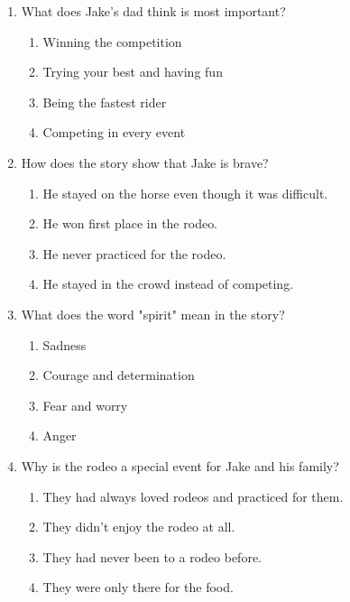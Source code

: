 \documentclass[12pt]{article}
\begin{document}
\begin{enumerate}
    \vspace{0.5cm}

    \item What does Jake's dad think is most important?

    \begin{enumerate}[label=\Alph*.]
        \item Winning the competition
        \item Trying your best and having fun
        \item Being the fastest rider
        \item Competing in every event
    \end{enumerate}

    \vspace{0.5cm}

    \item How does the story show that Jake is brave?

    \begin{enumerate}[label=\Alph*.]
        \item He stayed on the horse even though it was difficult.
        \item He won first place in the rodeo.
        \item He never practiced for the rodeo.
        \item He stayed in the crowd instead of competing.
    \end{enumerate}

    \vspace{0.5cm}

    \item What does the word "spirit" mean in the story?

    \begin{enumerate}[label=\Alph*.]
        \item Sadness
        \item Courage and determination
        \item Fear and worry
        \item Anger
    \end{enumerate}

    \vspace{0.5cm}

    \item Why is the rodeo a special event for Jake and his family?

    \begin{enumerate}[label=\Alph*.]
        \item They had always loved rodeos and practiced for them.
        \item They didn’t enjoy the rodeo at all.
        \item They had never been to a rodeo before.
        \item They were only there for the food.
    \end{enumerate}

    \vspace{0.5cm}

\end{enumerate}
\newpage
\end{document}
